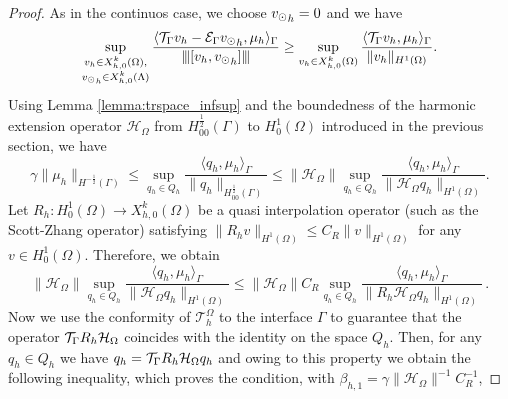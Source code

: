 \documentclass[r]{siamart171218}
\begin{document}
\begin{proof}
As in the continuos case, we choose ${v_{\odot}}_h =0$ and we have
\begin{equation*}
\sup_{\substack{v_h \in X_{h,0}^k(\Omega),\\ {v_{\odot}}_h \in X_{h,0}^k(\Lambda)}} \frac{ \langle {\mathcal{T}_\Gamma} v_h - \mathcal{E}_\Gamma {v_{\odot}}_h, \mu_h \rangle _{\Gamma}} {{\left\vert\kern-0.25ex\left\vert\kern-0.25ex\left\vert [v_h,  {v_{\odot}}_h] \right\vert\kern-0.25ex\right\vert\kern-0.25ex\right\vert}}
\geq \sup_{v_h \in X_{h,0}^k(\Omega)} \frac{ \langle {\mathcal{T}_\Gamma} v_h, \mu_h \rangle _{\Gamma} } {\|v_h\|_{H^1(\Omega)}}.
\end{equation*}
Using Lemma \ref{lemma:trspace_infsup} and the boundedness of the harmonic extension operator $\mathcal{H}_\Omega$ from $H^{\frac 12}_{00}(\Gamma)$ to $H^1_0(\Omega)$ introduced in the previous section, we have
\begin{equation*}
\gamma \|\mu_h\|_{H^{-\frac 12}(\Gamma)} \leq  \sup_{q_h \in Q_h} \frac{ \langle q_h, \mu_h \rangle _{\Gamma} } {\|q_h\|_{H^{\frac 12}_{00}(\Gamma)}} 
\leq 
\|\mathcal{H}_\Omega\| \sup_{q_h \in Q_h} \frac{ \langle q_h, \mu_h \rangle _{\Gamma} } {\|\mathcal{H}_\Omega q_h\|_{H^1(\Omega)}} .
\end{equation*}
Let $R_h: H^1_0(\Omega) \rightarrow X_{h,0}^k(\Omega)$ be a quasi interpolation operator (such as the Scott-Zhang operator) satisfying 
$\|R_h v\|_{H^1(\Omega)} \leq C_R \|v\|_{H^1(\Omega)}$ for any  $v \in H^1_0(\Omega)$.
Therefore, we obtain 
\begin{equation*}
\|\mathcal{H}_\Omega\| \sup_{q_h \in Q_h} \frac{ \langle q_h, \mu_h \rangle _{\Gamma} } {\|\mathcal{H}_\Omega q_h\|_{H^1(\Omega)}} 
\leq
\|\mathcal{H}_{\Omega}\| C_R \sup_{q_h \in Q_h} \frac{ \langle q_h, \mu_h \rangle _{\Gamma} } {\|R_h \mathcal{H}_{\Omega} q_h\|_{H^1(\Omega)}}\,.
\end{equation*}
Now we use the conformity of $\mathcal{T}^{\Omega}_h$ to the interface $\Gamma$
to guarantee that the operator ${\mathcal{T}_\Gamma} R_h  \mathcal{H}_{\Omega}$ coincides with the identity on the space $Q_h$. Then, for any $q_h \in Q_h$ we have $q_h = {\mathcal{T}_\Gamma} R_h  \mathcal{H}_{\Omega} q_h$
and owing to this property we obtain the following inequality, which proves the condition, with $\beta_{h,1} = \gamma \|\mathcal{H}_{\Omega}\|^{-1} C_R^{-1}$,

\end{proof}
\end{document}
